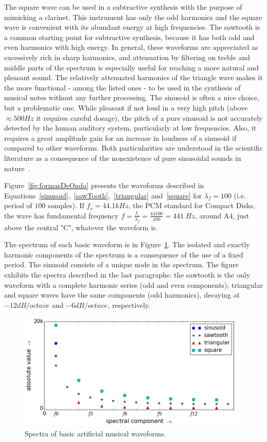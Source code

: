 The square wave can be used in a subtractive synthesis with the purpose of mimicking a clarinet. This instrument has only the odd harmonics and the square wave is convenient with its abundant energy at high frequencies.
The sawtooth is a common starting point for subtractive synthesis, because it has both odd and even harmonics with high energy. In general, these waveforms are appreciated as excessively rich in sharp harmonics, and attenuation by filtering on treble and middle parts of the spectrum is especially useful for reaching a more natural and pleasant sound. 
The relatively attenuated harmonics of the triangle wave makes it the more functional - among the listed ones - to be used in the synthesis of musical notes without any further processing. The sinusoid is often a nice choice, but a problematic one. While pleasant if not loud in a very high pitch (above $\approx 500Hz$ it requires careful dosage), the pitch of a pure sinusoid is not accurately detected by the human auditory system, particularly at low frequencies. Also, it requires a great amplitude gain for an increase in loudness of a sinusoid if compared to other waveforms. Both particularities are understood in the scientific literature as a consequence of the nonexistence of pure sinusoidal sounds in nature~\cite{Roederer}.

Figure~\ref{fig:formasDeOnda} presents the waveforms described in Equations~\ref{sinusoid},~\ref{sawTooth},~\ref{triangular} and~\ref{square} for $\lambda_f=100$ (i.e. period of $100$ samples). If $f_s=44.1kHz$, the PCM standard for Compact Disks, the wave has fundamental frequency $f=\frac{f_s}{\lambda_f}=\frac{44100}{100} = 441 \; Hz$, around A4, just above the central "C", whatever the waveform is.

The spectrum of each basic waveform is in Figure~\ref{fig:espectroDeOndas}. The isolated and exactly harmonic components of the spectrum is a consequence of the use of a fixed period. The sinusoid consists of a unique node in the spectrum. The figure exhibits the spectra described in the last paragraphs: the sawtooth is the only waveform with a complete harmonic series (odd and even components); triangular and square waves have the same components (odd harmonics), decaying at $-12dB/octave$ and $-6dB/octave$, respectively.

\begin{figure}
    \centering
        \includegraphics[width=.7\textwidth]{figures/waveSpectrum_}
    \caption{Spectra of basic artificial musical waveforms.}
        \label{fig:espectroDeOndas}
\end{figure}

